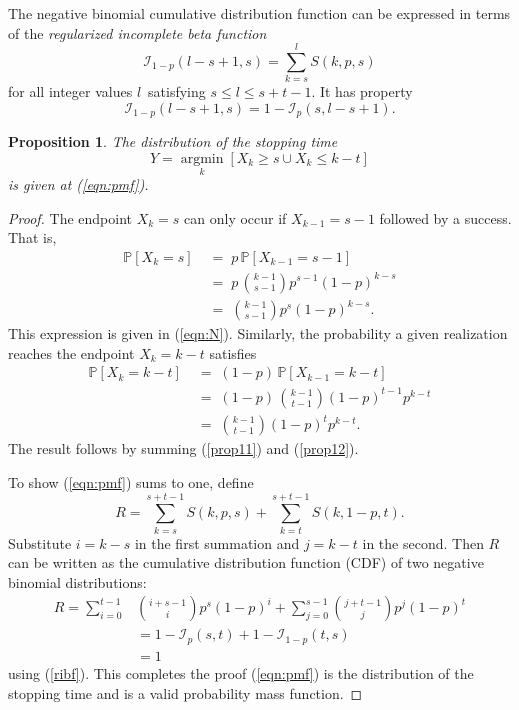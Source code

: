 \documentclass[sii]{ipart}
\DeclareMathOperator*{\argmin}{argmin}
\newcommand*{\argminl}{\argmin\limits}
\newtheorem{prop}{Proposition}
\begin{document}
The negative binomial cumulative distribution function can be expressed in terms of the
{\em regularized incomplete beta function} \citep{Olver2010} 
\begin{equation*}
\mathcal{I}_{1-p}(l - s + 1, s) = \sum_{k=s}^l S(k, p, s) 
\end{equation*}
for all integer values $l\,$ satisfying $s \leq l \leq s+t-1$. It has property \citep{Uppuluri1967}
\begin{equation} \label{ribf}
\mathcal{I}_{1-p}(l-s+1, s) = 1 - \mathcal{I}_p(s, l-s+1).
\end{equation}

\begin{prop} \label{stopping_time}
The distribution of the stopping time
\begin{equation*}
Y = \argminl_k \left[X_k \geq s \cup X_k \leq k-t \right]
\end{equation*}
is given at (\ref{eqn:pmf}).
\end{prop}
\begin{proof}

The endpoint $X_k = s$ can only occur if $X_{k-1} = s-1$ followed by a success. That is, 
\begin{align} \label{prop11}
\mathbb{P} [X_k =s ] \;&=\; p \, \mathbb{P} [X_{k-1} = s-1 ] \nonumber \\
 &=\; p\, {k-1 \choose s-1} p^{s-1} (1-p)^{k-s} \nonumber \\
 &=\; {k-1 \choose s-1} p^{s} (1-p)^{k-s}.
\end{align}
This expression is given
in (\ref{eqn:N}). 
Similarly, the probability a given realization reaches the endpoint $X_k = k-t$
satisfies 
\begin{align} \label{prop12}
\mathbb{P} [X_k = k-t ] \;&=\; (1-p) \, \mathbb{P} [X_{k-1} = k-t ] \nonumber \\
 &=\; (1-p)\, {k-1 \choose t-1} (1-p)^{t-1} p^{k-t} \nonumber \\
&=\; {k-1 \choose t-1} (1-p)^{t} p^{k-t}.
\end{align}
The result follows by summing (\ref{prop11}) and (\ref{prop12}).

To show (\ref{eqn:pmf}) sums to one, define
\begin{equation*} 
R = \sum_{k=s}^{s+t-1} S(k, p, s) + \sum_{k=t}^{s+t-1} S(k, 1-p, t).
\end{equation*}
Substitute $i=k-s$ in the first summation and $j=k-t$ in the second. Then
$R$ can be written as the cumulative distribution function (CDF) of two
negative binomial distributions:
\begin{align*}
R = \sum_{i=0}^{t-1} &{i+s-1 \choose i} p^s (1-p)^i +
\sum_{j=0}^{s-1}  {j+t-1 \choose j} p^j  (1-p)^t \\
   &= 1-\mathcal{I}_p(s, t) + 1 - \mathcal{I}_{1-p}(t, s) \\
   &= 1
\end{align*}
using (\ref{ribf}). This completes the proof (\ref{eqn:pmf}) is the distribution 
of the stopping time and is a valid probability mass function.
\end{proof}
\end{document}
